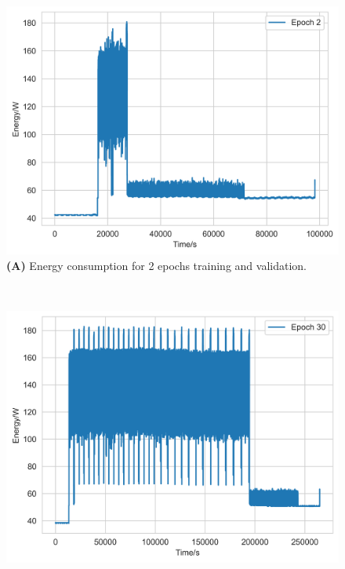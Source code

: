 \documentclass[utf8]{FrontiersinVancouver} %
\begin{document}
\begin{figure}[p]

  \begin{center}
     \begin{minipage}[t]{0.30\textwidth}
        \includegraphics[width=1.0\linewidth]{images/card-name-v100-gpu-count-1-cpu-num-6-mem-32gb-repeat-1-tfttransformerepochs-2.png}
        {\bf (A)} Energy consumption for 2 epochs training and validation.
     \end{minipage}
     \ \
     \begin{minipage}[t]{0.30\textwidth}
        \includegraphics[width=1.0\linewidth]{images/card-name-v100-gpu-count-1-cpu-num-6-mem-32gb-repeat-1-tfttransformerepochs-30.png}

\end{minipage}
\end{center}
\end{figure}
\end{document}
